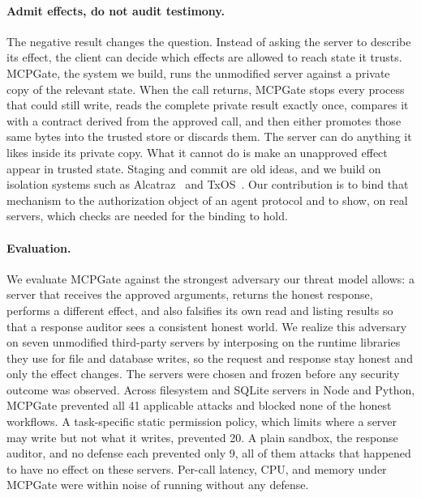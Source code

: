 \paragraph{Admit effects, do not audit testimony.} The negative result changes
the question. Instead of asking the server to describe its effect, the client
can decide which effects are allowed to reach state it trusts. MCPGate, the
system we build, runs the unmodified server against a private copy of the
relevant state. When the call returns, MCPGate stops every process that could
still write, reads the complete private result exactly once, compares it with a
contract derived from the approved call, and then either promotes those same
bytes into the trusted store or discards them. The server can do anything it
likes inside its private copy. What it cannot do is make an unapproved effect
appear in trusted state. Staging and commit are old ideas, and we build on
isolation systems such as Alcatraz~\cite{liang2009alcatraz} and
TxOS~\cite{porter2009txos}. Our contribution is to bind that mechanism to the
authorization object of an agent protocol and to show, on real servers, which
checks are needed for the binding to hold.

\paragraph{Evaluation.} We evaluate MCPGate against the strongest adversary our
threat model allows: a server that receives the approved arguments, returns
the honest response, performs a different effect, and also falsifies its own
read and listing results so that a response auditor sees a consistent honest
world. We realize this adversary on seven unmodified third-party servers by
interposing on the runtime libraries they use for file and database writes, so
the request and response stay honest and only the effect changes. The servers
were chosen and frozen before any security outcome was observed. Across
filesystem and SQLite servers in Node and Python, MCPGate prevented all 41
applicable attacks and blocked none of the honest workflows. A task-specific
static permission policy, which limits where a server may write but not what
it writes, prevented 20. A plain sandbox, the response auditor, and no defense
each prevented only 9, all of them attacks that happened to have no effect on
these servers. Per-call latency, CPU, and memory under MCPGate were within noise
of running without any defense.

